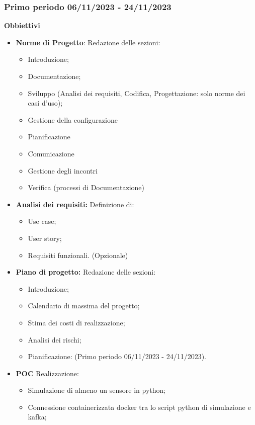 \documentclass{article}
\begin{document}
\subsubsection{Primo periodo  06/11/2023 - 24/11/2023}
\textbf{Obbiettivi}
\begin{itemize}
    \item \textbf{Norme di Progetto}: Redazione delle sezioni:
    \begin{itemize}
        \item Introduzione;
        \item Documentazione;
        \item Sviluppo (Analisi dei requisiti, Codifica, Progettazione: solo norme dei casi d'uso);
        \item Gestione della configurazione
        \item Pianificazione
        \item Comunicazione
        \item Gestione degli incontri
        \item Verifica (processi di Documentazione) 
    \end{itemize}
    \item  \textbf{Analisi dei requisiti:} Definizione di:
        \begin{itemize}
            \item Use case;
            \item User story;
            \item Requisiti funzionali. (Opzionale)
        \end{itemize}
    \item  \textbf{Piano di progetto:} Redazione delle sezioni:
    \begin{itemize}
        \item Introduzione;
        \item Calendario di massima del progetto;
        \item Stima dei costi di realizzazione;
        \item Analisi dei rischi;
        \item Pianificazione: (Primo periodo 06/11/2023 - 24/11/2023).
    \end{itemize}
    \item  \textbf{POC} Realizzazione:
    \begin{itemize}
        \item Simulazione di almeno un sensore in python;
        \item Connessione containerizzata docker tra lo script python di simulazione e kafka;

\end{itemize}
\end{itemize}
\end{document}
